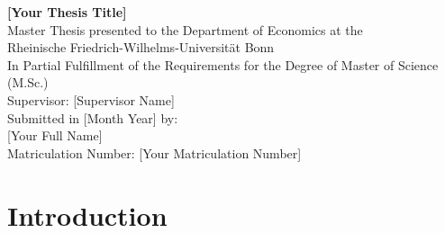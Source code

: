 \documentclass[12pt,a4paper]{article}%
\begin{document}
\begin{titlepage}
  \centering
  \vspace*{5cm}
  {\Huge \textbf{[Your Thesis Title]}}\\[2cm]
  {\large Master Thesis presented to the Department of Economics at the}\\
  {\large Rheinische Friedrich-Wilhelms-Universität Bonn}\\[1cm]
  {\large In Partial Fulfillment of the Requirements for the Degree of Master of Science (M.Sc.)}\\[2cm]
  Supervisor: [Supervisor Name] \\[0.5cm]
  Submitted in [Month Year] by: \\[0.2cm]
  [Your Full Name] \\[0.2cm]
  Matriculation Number: [Your Matriculation Number]
  \vfill
\end{titlepage}

\tableofcontents
\thispagestyle{empty}
\newpage

\setcounter{page}{1}


\section{Introduction}
\lipsum[1-2]
\end{document}
